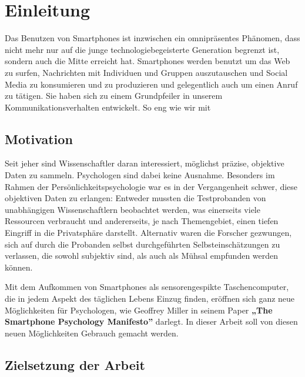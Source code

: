 
\chapter{Einleitung}
\label{ch:Einleitung}

Das Benutzen von Smartphones ist inzwischen ein omnipräsentes Phänomen,
dass nicht mehr nur auf die junge technologiebegeisterte Generation begrenzt ist,
sondern auch die Mitte erreicht hat\cite{smartphonealter}.
Smartphones werden benutzt um das Web zu surfen, Nachrichten mit Individuen und Gruppen auszutauschen und Social Media zu konsumieren und zu produzieren und gelegentlich auch um einen Anruf zu tätigen.
Sie haben sich zu einem Grundpfeiler in unserem Kommunikationsverhalten entwickelt.
So eng wie wir mit 

\section{Motivation}

Seit jeher sind Wissenschaftler daran interessiert, möglichst präzise, objektive Daten zu sammeln.
Psychologen sind dabei keine Ausnahme.
Besonders im Rahmen der Persönlichkeitspsychologie war es in der Vergangenheit schwer, diese objektiven Daten zu erlangen:
Entweder mussten die Testprobanden von unabhängigen Wissenschaftlern beobachtet werden,
was einerseits viele Ressourcen verbraucht und andererseits, je nach Themengebiet,
einen tiefen Eingriff in die Privatsphäre darstellt. Alternativ waren die Forscher gezwungen,
sich auf durch die Probanden selbst durchgeführten Selbsteinschätzungen zu verlassen,
die sowohl subjektiv sind, als auch als Mühsal empfunden werden können.\par

Mit dem Aufkommen von Smartphones als sensorengespikte Taschencomputer, die in jedem Aspekt des täglichen Lebens Einzug finden,
eröffnen sich ganz neue Möglichkeiten für Psychologen, wie Geoffrey Miller in seinem Paper \textbf{„The Smartphone Psychology Manifesto”} \cite{miller2012smartphone}
darlegt. In dieser Arbeit soll von diesen neuen Möglichkeiten Gebrauch gemacht werden.\par




\section{Zielsetzung der Arbeit}
\label{ch:Einleitung:sec:Zielsetzung}

